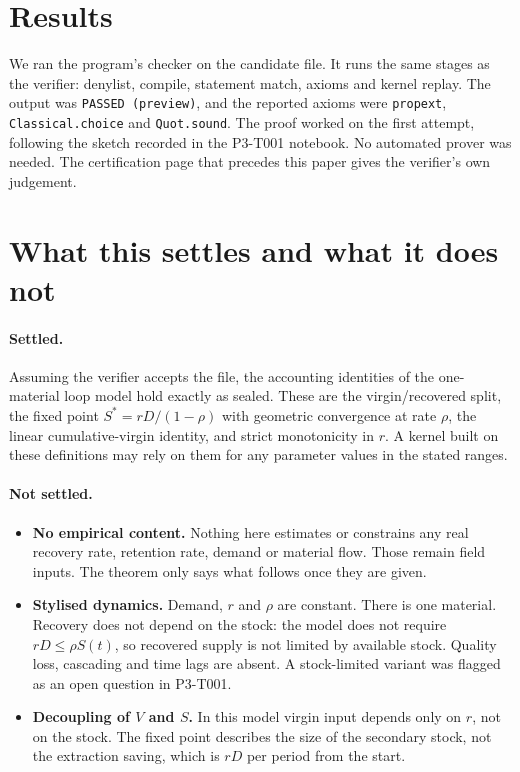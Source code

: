 \documentclass[11pt]{article}
\theoremstyle{definition}
\theoremstyle{remark}
\begin{document}
\section{Results}
\label{sec:results}
We ran the program's checker on the candidate file. It runs the same stages as the verifier:
denylist, compile, statement match, axioms and kernel replay. The output was
\texttt{PASSED (preview)}, and the reported axioms were \texttt{propext},
\texttt{Classical.choice} and \texttt{Quot.sound}. The proof worked on the first attempt,
following the sketch recorded in the P3-T001 notebook. No automated prover was needed. The
certification page that precedes this paper gives the verifier's own judgement.

\section{What this settles and what it does not}
\label{sec:limits}
\paragraph{Settled.} Assuming the verifier accepts the file, the accounting identities of the
one-material loop model hold exactly as sealed. These are the virgin/recovered split, the fixed
point $S^\ast=rD/(1-\rho)$ with geometric convergence at rate $\rho$, the linear
cumulative-virgin identity, and strict monotonicity in $r$. A kernel built on these definitions
may rely on them for any parameter values in the stated ranges.

\paragraph{Not settled.}
\begin{itemize}
\item \textbf{No empirical content.} Nothing here estimates or constrains any real recovery
rate, retention rate, demand or material flow. Those remain field inputs. The theorem only says
what follows once they are given.
\item \textbf{Stylised dynamics.} Demand, $r$ and $\rho$ are constant. There is one material.
Recovery does not depend on the stock: the model does not require $rD\le\rho S(t)$, so recovered
supply is not limited by available stock. Quality loss, cascading and time lags are absent.
A stock-limited variant was flagged as an open question in P3-T001.
\item \textbf{Decoupling of $V$ and $S$.} In this model virgin input depends only on $r$, not on
the stock. The fixed point describes the size of the secondary stock, not the extraction
saving, which is $rD$ per period from the start.
\end{itemize}
\end{document}
